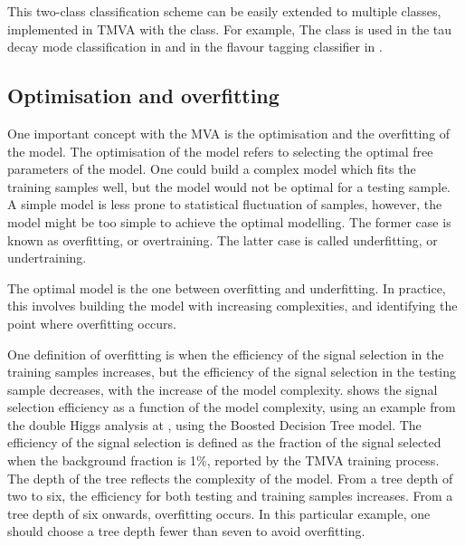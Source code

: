 This two-class classification scheme can  be easily extended to multiple classes, implemented in TMVA with the \multiclass class. For example, The \multiclass class is used in the tau decay mode classification in  and in the flavour tagging classifier in .


\subsection{Optimisation and overfitting}
\label{sec:pandoraMVAoptimisation}

One important concept with the MVA is the optimisation and the overfitting of the model. The optimisation of the model refers to selecting the optimal free parameters of the model. One could build a complex model which fits the training samples well, but the model would not be optimal for a testing sample. A simple model is less prone to statistical fluctuation of samples, however, the model might be too simple to achieve the optimal modelling. The former case is known as overfitting, or overtraining. The latter case is called underfitting, or undertraining.


The optimal model is the one between overfitting and underfitting. In practice, this involves building the model with increasing complexities, and identifying the point where overfitting occurs.

One definition of  overfitting is when the efficiency of the signal selection in the training samples increases, but the efficiency of the signal selection in the testing sample decreases, with the increase of the model complexity.  shows the signal selection efficiency as a function of the model complexity, using an example from the double Higgs analysis at , using the Boosted Decision Tree model. The efficiency of the signal selection is defined as the  fraction of the signal selected when the background fraction is 1\%, reported by the TMVA training process. The depth of the tree  reflects the complexity of the model. From a tree depth of two to six, the efficiency for both testing and training samples increases. From a tree depth of six onwards, overfitting occurs. In this particular example, one should choose a tree depth fewer than seven to avoid overfitting.

